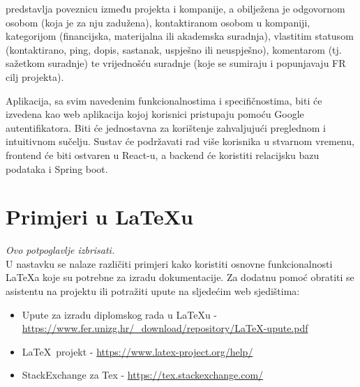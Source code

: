 		{ predstavlja poveznicu između projekta i kompanije, a obilježena je odgovornom osobom (koja je za nju zadužena), kontaktiranom osobom u kompaniji, kategorijom (financijska, materijalna ili akademska suradnja), vlastitim statusom (kontaktirano, ping, dopis, sastanak, uspješno ili neuspješno), komentarom (tj. sažetkom suradnje) te vrijednošću suradnje (koje se sumiraju i popunjavaju FR cilj projekta).}\vspace{0.3cm}

		{Aplikacija, sa svim navedenim funkcionalnostima i specifičnostima, biti će izvedena kao web aplikacija kojoj korisnici pristupaju pomoću Google autentifikatora. Biti će jednostavna za korištenje zahvaljujući preglednom i intuitivnom sučelju. Sustav će podržavati rad više korisnika u stvarnom vremenu, frontend će biti ostvaren u React-u, a backend će koristiti relacijsku bazu podataka i Spring boot.}

		\eject

\iffalse %

		\section{Primjeri u \LaTeX u}
		
		\textit{Ovo potpoglavlje izbrisati.}\\

		U nastavku se nalaze različiti primjeri kako koristiti osnovne funkcionalnosti \LaTeX a koje su potrebne za izradu dokumentacije. Za dodatnu pomoć obratiti se asistentu na projektu ili potražiti upute na sljedećim web sjedištima:
		\begin{itemize}
			\item Upute za izradu diplomskog rada u \LaTeX u - \url{https://www.fer.unizg.hr/_download/repository/LaTeX-upute.pdf}
			\item \LaTeX\ projekt - \url{https://www.latex-project.org/help/}
			\item StackExchange za Tex - \url{https://tex.stackexchange.com/}\\
		
		\end{itemize} 	

